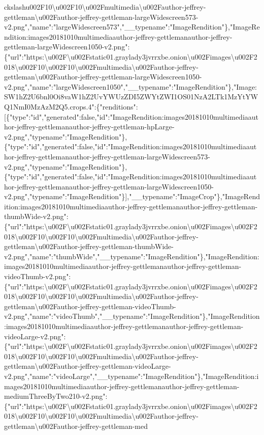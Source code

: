 ckslash{}u002F10\textbackslash{}u002F10\textbackslash{}u002Fmultimedia\textbackslash{}u002Fauthor-jeffrey-gettleman\textbackslash{}u002Fauthor-jeffrey-gettleman-largeWidescreen573-v2.png","name":"largeWidescreen573","\_\_typename":"ImageRendition"\},"ImageRendition:images20181010multimediaauthor-jeffrey-gettlemanauthor-jeffrey-gettleman-largeWidescreen1050-v2.png":\{"url":"https:\textbackslash{}u002F\textbackslash{}u002Fstatic01.graylady3jvrrxbe.onion\textbackslash{}u002Fimages\textbackslash{}u002F2018\textbackslash{}u002F10\textbackslash{}u002F10\textbackslash{}u002Fmultimedia\textbackslash{}u002Fauthor-jeffrey-gettleman\textbackslash{}u002Fauthor-jeffrey-gettleman-largeWidescreen1050-v2.png","name":"largeWidescreen1050","\_\_typename":"ImageRendition"\},"Image:SW1hZ2U6bnl0Oi8vaW1hZ2UvYWUzZDI5ZWYtZWI1OS01NzA2LTk1MzYtYWQ1NmI0MzAzM2Q5.crops.4":\{"renditions":{[}\{"type":"id","generated":false,"id":"ImageRendition:images20181010multimediaauthor-jeffrey-gettlemanauthor-jeffrey-gettleman-hpLarge-v2.png","typename":"ImageRendition"\},\{"type":"id","generated":false,"id":"ImageRendition:images20181010multimediaauthor-jeffrey-gettlemanauthor-jeffrey-gettleman-largeWidescreen573-v2.png","typename":"ImageRendition"\},\{"type":"id","generated":false,"id":"ImageRendition:images20181010multimediaauthor-jeffrey-gettlemanauthor-jeffrey-gettleman-largeWidescreen1050-v2.png","typename":"ImageRendition"\}{]},"\_\_typename":"ImageCrop"\},"ImageRendition:images20181010multimediaauthor-jeffrey-gettlemanauthor-jeffrey-gettleman-thumbWide-v2.png":\{"url":"https:\textbackslash{}u002F\textbackslash{}u002Fstatic01.graylady3jvrrxbe.onion\textbackslash{}u002Fimages\textbackslash{}u002F2018\textbackslash{}u002F10\textbackslash{}u002F10\textbackslash{}u002Fmultimedia\textbackslash{}u002Fauthor-jeffrey-gettleman\textbackslash{}u002Fauthor-jeffrey-gettleman-thumbWide-v2.png","name":"thumbWide","\_\_typename":"ImageRendition"\},"ImageRendition:images20181010multimediaauthor-jeffrey-gettlemanauthor-jeffrey-gettleman-videoThumb-v2.png":\{"url":"https:\textbackslash{}u002F\textbackslash{}u002Fstatic01.graylady3jvrrxbe.onion\textbackslash{}u002Fimages\textbackslash{}u002F2018\textbackslash{}u002F10\textbackslash{}u002F10\textbackslash{}u002Fmultimedia\textbackslash{}u002Fauthor-jeffrey-gettleman\textbackslash{}u002Fauthor-jeffrey-gettleman-videoThumb-v2.png","name":"videoThumb","\_\_typename":"ImageRendition"\},"ImageRendition:images20181010multimediaauthor-jeffrey-gettlemanauthor-jeffrey-gettleman-videoLarge-v2.png":\{"url":"https:\textbackslash{}u002F\textbackslash{}u002Fstatic01.graylady3jvrrxbe.onion\textbackslash{}u002Fimages\textbackslash{}u002F2018\textbackslash{}u002F10\textbackslash{}u002F10\textbackslash{}u002Fmultimedia\textbackslash{}u002Fauthor-jeffrey-gettleman\textbackslash{}u002Fauthor-jeffrey-gettleman-videoLarge-v2.png","name":"videoLarge","\_\_typename":"ImageRendition"\},"ImageRendition:images20181010multimediaauthor-jeffrey-gettlemanauthor-jeffrey-gettleman-mediumThreeByTwo210-v2.png":\{"url":"https:\textbackslash{}u002F\textbackslash{}u002Fstatic01.graylady3jvrrxbe.onion\textbackslash{}u002Fimages\textbackslash{}u002F2018\textbackslash{}u002F10\textbackslash{}u002F10\textbackslash{}u002Fmultimedia\textbackslash{}u002Fauthor-jeffrey-gettleman\textbackslash{}u002Fauthor-jeffrey-gettleman-med